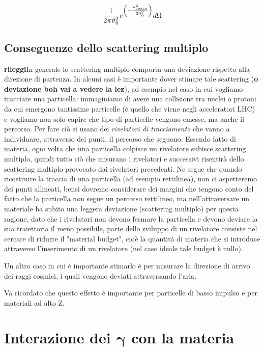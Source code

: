 $$\frac{1}{2 \pi \vartheta_0^2}e^{\left(-\frac{\vartheta_{\rm space}^2}{2\vartheta_0^2}\right)}d \Omega$$

\section{Conseguenze dello scattering multiplo}

\textbf{rileggi}In generale lo scattering multiplo comporta una deviazione rispetto alla direzione di partenza. In alcuni casi è importante dover stimare tale scattering (\textbf{o deviazione boh vai a vedere la lez}), ad esempio nel caso in cui vogliamo tracciare una particella: immaginiamo di avere una collisione tra nuclei o protoni da cui emergono tantissime particelle (è quello che viene negli acceleratori LHC) e vogliamo non solo capire che tipo di particelle vengono emesse, ma anche il percorso. Per fare ciò si usano dei \textit{rivelatori di tracciamento} che vanno a individuare, attraverso dei punti, il percorso che seguono. Essendo fatto di materia, ogni volta che una particella colpisce un rivelatore subisce scattering multiplo, quindi tutto ciò che misurano i rivelatori e successivi risentirà dello scattering multiplo provocato dai rivelatori precedenti. Ne segue che quando ricostruire la traccia di una particella (ad esempio rettilinea), non ci aspetteremo dei punti allineati, bensì dovremo considerare dei margini che tengono conto del fatto che la particella non segue un percorso rettilineo, ma nell'attraversare un materiale ha subito una leggera deviazione (scattering multiplo) per questa ragione, dato che i rivelatori non devono fermare la particella e devono deviare la sua traiettoria il meno possibile, parte dello sviluppo di un rivelatore consiste nel cercare di ridurre il "material budget", cioè la quantità di materia che si introduce attraverso l'inserimento di un rivelatore (nel caso ideale tale budget è nullo).

Un altro caso in cui è importante stimarlo è per misurare la direzione di arrivo dei raggi cosmici, i quali vengono deviati attraversando l'aria.

Va ricordato che questo effetto è importante per particelle di basso impulso e per materiali ad alto Z.

\chapter[Interazione dei \texorpdfstring{$\gamma$}{\textgamma} con la materia]
{Interazione dei $\boldsymbol{\gamma}$ con la materia}

